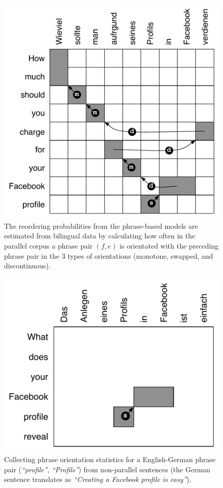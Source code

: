 \documentclass[11pt,letterpaper]{article}
\newcommand{\emq}[1]{\emph{``#1''}}
\begin{document}
\begin{figure}[t*]
\begin{center}
\includegraphics[width=0.8 \linewidth]{../figures/reorderfeats/reorderfeats.pdf}
\caption{The reordering probabilities from the phrase-based models are estimated from bilingual data by calculating how often in the parallel corpus a phrase pair $(f, e)$ is orientated with the preceding phrase pair in the 3 types of orientations (monotone, swapped, and discontinuous). }
\label{fig:reorderfeats} 
\end{center}
\vskip -0.2in
\end{figure}

\begin{figure}[t*]
\begin{center}
\includegraphics[width=0.8 \linewidth]{../figures/monoreord/monoreord.pdf}
\caption{Collecting phrase orientation statistics for a English-German phrase pair (\emq{profile}, \emq{Profils}) from non-parallel sentences (the German sentence translates as  \emq{Creating a Facebook profile is easy}). %
}
\label{fig:monoreord}
\end{center}
\vskip -0.2in
\end{figure}
\end{document}
